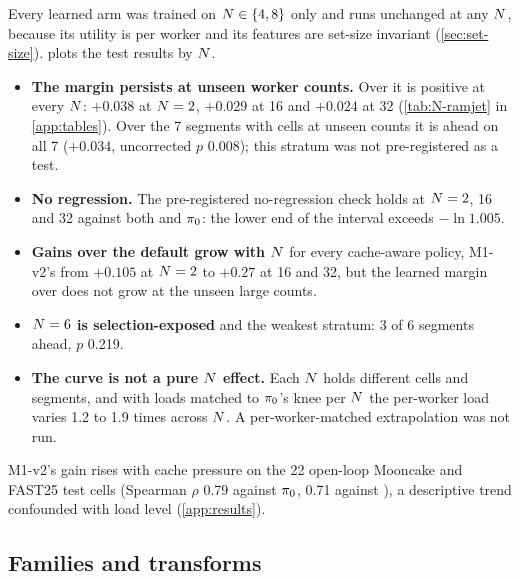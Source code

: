 Every learned arm was trained on $N \in \{4, 8\}$ only and runs unchanged at any $N$, because its
utility is per worker and its features are set-size invariant (\cref{sec:set-size}).
 plots the test results by $N$.
\begin{itemize}
  \item \textbf{The margin persists at unseen worker counts.} Over  it is positive at
    every $N$: $+0.038$ at $N = 2$, $+0.029$ at 16 and $+0.024$ at 32 (\cref{tab:N-ramjet} in
    \cref{app:tables}). Over
    the 7 segments with cells at unseen counts it is ahead on all 7 ($+0.034$, uncorrected $p$
    0.008); this stratum was not pre-registered as a test.
  \item \textbf{No regression.} The pre-registered no-regression check holds at $N = 2$, 16 and 32
    against both  and $\pi_{0}$: the lower end of the interval exceeds
    $-\ln 1.005$.
  \item \textbf{Gains over the default grow with $N$} for every cache-aware policy, M1-v2's from
    $+0.105$ at $N = 2$ to $+0.27$ at 16 and 32, but the learned margin over  does
    not grow at the unseen large counts.
  \item \textbf{$N = 6$ is selection-exposed} and the weakest stratum: 3 of 6 segments ahead,
    $p$ 0.219.
  \item \textbf{The curve is not a pure $N$ effect.} Each $N$ holds different cells and
    segments, and with loads matched to $\pi_{0}$'s knee per $N$ the per-worker load varies 1.2 to
    1.9 times across $N$. A per-worker-matched extrapolation was not run.
\end{itemize}
M1-v2's gain rises with cache pressure on the 22 open-loop Mooncake and FAST25 test cells (Spearman
$\rho$ 0.79 against $\pi_{0}$, 0.71 against ), a descriptive trend confounded with load
level (\cref{app:results}).

\subsection{Families and transforms}

